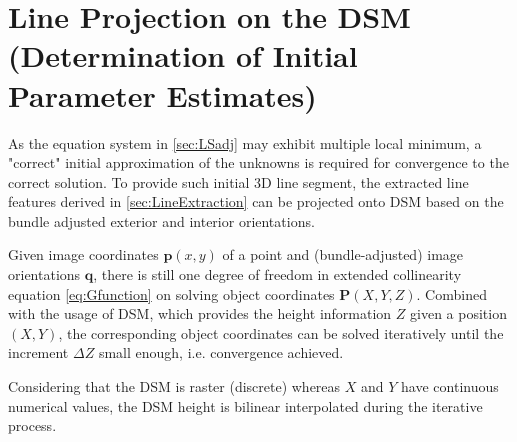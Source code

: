 

\section{Line Projection on the DSM (Determination of Initial Parameter Estimates)}
\label{sec:LineProjectionOnDSM}

As the equation system in \cref{sec:LSadj} may exhibit multiple local minimum, a "correct" initial approximation of the unknowns is required for convergence to the correct solution. To provide such initial 3D line segment, the extracted line features derived in \cref{sec:LineExtraction} can be projected onto DSM based on the bundle adjusted exterior and interior orientations.

Given image coordinates $\mathbf{p}(x,y)$ of a point and (bundle-adjusted) image orientations $\mathbf{q}$, there is still one degree of freedom in extended collinearity equation \eqref{eq:Gfunction} on solving object coordinates $\mathbf{P}(X,Y,Z)$. Combined with the usage of DSM, which provides the height information $Z$ given a position $(X,Y)$, the corresponding object coordinates can be solved iteratively until the increment $\Delta Z$ small enough, i.e. convergence achieved. %

Considering that the DSM is raster (discrete) whereas $X$ and $Y$ have continuous numerical values, the DSM height is bilinear interpolated during the iterative process.




